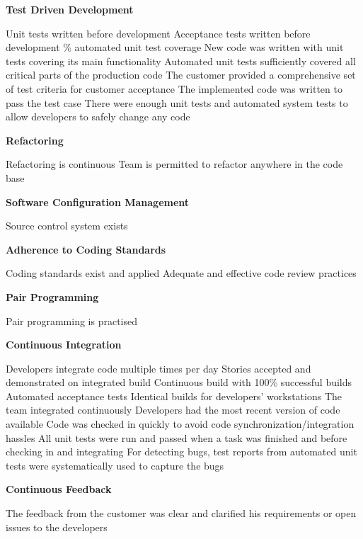\textbf{Test Driven Development}
\begin{itemize}
	\taa Unit tests written before development
	\taa Acceptance tests written before development
	\% automated unit test coverage
	\pam New code was written with unit tests covering its main functionality
	\pam Automated unit tests sufficiently covered all critical parts of the production code
	\pam The customer provided a comprehensive set of test criteria for customer acceptance
	\pam The implemented code was written to pass the test case
	\pamr There were enough unit tests and automated system tests to allow developers to safely change any code
\end{itemize}

\textbf{Refactoring}
\begin{itemize}
	\taa Refactoring is continuous
	\taa Team is permitted to refactor anywhere in the code base
\end{itemize}

\textbf{Software Configuration Management}
\begin{itemize}
	\taa Source control system exists
\end{itemize}

\textbf{Adherence to Coding Standards}
\begin{itemize}
	\taa Coding standards exist and applied
	\taar Adequate and effective code review practices 
\end{itemize}

\textbf{Pair Programming}
\begin{itemize}
	\taa Pair programming is practised
\end{itemize}

\textbf{Continuous Integration}
\begin{itemize}
	\taa Developers integrate code multiple times per day
	\taa Stories accepted and demonstrated on integrated build
	\taa Continuous build with 100\% successful builds
	\taa Automated acceptance tests
	\taa Identical builds for developers' workstations
	\pam The team integrated continuously
	\pam Developers had the most recent version of code available
	\pam Code was checked in quickly to avoid code synchronization/integration hassles
	\pam All unit tests were run and passed when a task was finished and before checking in and integrating 
	\pamr For detecting bugs, test reports from automated unit tests were systematically used to capture the bugs
\end{itemize}

\textbf{Continuous Feedback}
\begin{itemize}
	\pam The feedback from the customer was clear and clarified his requirements or open issues to the developers
\end{itemize}

